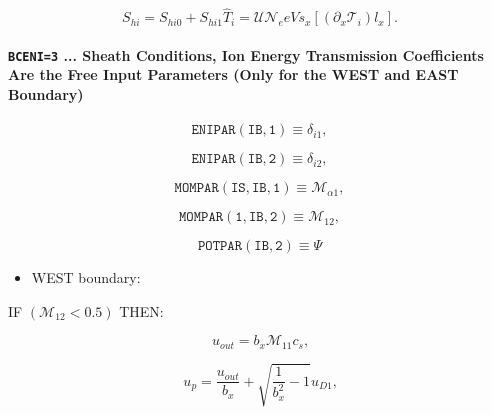 \documentclass[11pt]{article}
\begin{document}
\begin{equation}
S_{hi}=S_{hi0}+S_{hi1}\widehat{T}_{i}=\mathcal{UN}_{e}eVs_{x}\left[ \left(
\partial_{x}\mathcal{T}_{i}\right) l_{x}\right] \text{.}   \label{c245}
\end{equation}

\bigskip

\paragraph{\texttt{BCENI=3} ... Sheath Conditions, Ion Energy Transmission
Coefficients Are the Free Input Parameters (Only for the WEST and EAST
Boundary)}

\bigskip

\begin{equation*}
\mathtt{ENIPAR(IB,1)}\equiv\delta_{i1}, 
\end{equation*}

\begin{equation*}
\mathtt{ENIPAR(IB,2)}\equiv\delta_{i2}, 
\end{equation*}

\begin{equation*}
\mathtt{MOMPAR(IS,IB,1)}\equiv\mathcal{M}_{\alpha1}, 
\end{equation*}

\begin{equation*}
\mathtt{MOMPAR(1,IB,2)}\equiv\mathcal{M}_{12}, 
\end{equation*}

\begin{equation*}
\mathtt{POTPAR(IB,2)}\equiv\Psi 
\end{equation*}

\bigskip

\begin{itemize}
\item  WEST boundary:
\end{itemize}

\bigskip

IF $\left( \mathcal{M}_{12}<0.5\right) $ THEN:

\begin{equation}
u_{out}=b_{x}\mathcal{M}_{11}c_{s}\text{,}   \label{c246}
\end{equation}

\begin{equation}
u_{p}=\frac{u_{out}}{b_{x}}+\sqrt{\frac{1}{b_{x}^{2}}-1}u_{D1}\text{,} 
\label{c247}
\end{equation}
\end{document}
